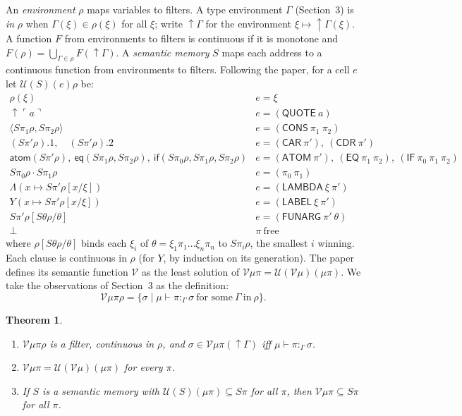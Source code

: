 \documentclass[11pt]{amsart}
\newtheorem{theorem}{Theorem}[section]
\theoremstyle{definition}
\theoremstyle{remark}
\newcommand{\kw}[1]{\mathsf{#1}}
\newcommand{\at}[1]{\ulcorner #1\urcorner}
\newcommand{\obs}[4]{#1\vdash #2:_{#3}#4}
\newcommand{\V}{\mathcal V}
\newcommand{\U}{\mathcal U}
\newcommand{\up}{{\uparrow}}
\begin{document}
An \emph{environment} $\rho$ maps variables to filters. A type
environment $\Gamma$ (Section~3) is \emph{in} $\rho$ when
$\Gamma(\xi)\in\rho(\xi)$ for all $\xi$; write $\up\Gamma$ for the
environment $\xi\mapsto\up\Gamma(\xi)$. A function $F$ from environments to
filters is continuous if it is monotone and
$F(\rho)=\bigcup_{\Gamma\in\rho}F(\up\Gamma)$. A \emph{semantic memory} $S$
maps each address to a continuous function from environments to filters.
Following the paper, for a cell $e$ let $\U(S)(e)\rho$ be:
\[
\begin{array}{ll}
\rho(\xi) & e=\xi\\
\up\at a & e=(\kw{QUOTE}\ a)\\
\langle S\pi_1\rho,S\pi_2\rho\rangle & e=(\kw{CONS}\ \pi_1\ \pi_2)\\
(S\pi'\rho).1,\quad(S\pi'\rho).2 & e=(\kw{CAR}\ \pi'),\ (\kw{CDR}\ \pi')\\
\kw{atom}(S\pi'\rho),\ \kw{eq}(S\pi_1\rho,S\pi_2\rho),\ \kw{if}(S\pi_0\rho,S\pi_1\rho,S\pi_2\rho)
 & e=(\kw{ATOM}\ \pi'),\ (\kw{EQ}\ \pi_1\ \pi_2),\ (\kw{IF}\ \pi_0\ \pi_1\ \pi_2)\\
S\pi_0\rho\cdot S\pi_1\rho & e=(\pi_0\ \pi_1)\\
\Lambda(x\mapsto S\pi'\rho[x/\xi]) & e=(\kw{LAMBDA}\ \xi\ \pi')\\
Y(x\mapsto S\pi'\rho[x/\xi]) & e=(\kw{LABEL}\ \xi\ \pi')\\
S\pi'\rho[S\theta\rho/\theta] & e=(\kw{FUNARG}\ \pi'\ \theta)\\
\bot & \pi\ \text{free}
\end{array}
\]
where $\rho[S\theta\rho/\theta]$ binds each $\xi_i$ of $\theta=\xi_1\pi_1\dots\xi_n\pi_n$
to $S\pi_i\rho$, the smallest $i$ winning. Each clause is continuous in
$\rho$ (for $Y$, by induction on its generation). The paper defines its semantic function $\V$ as the least solution
of $\V\mu\pi=\U(\V\mu)(\mu\pi)$. We take the observations of Section~3 as
the definition:
\[
\V\mu\pi\rho=\{\sigma\mid\obs\mu\pi\Gamma\sigma\ \text{for some}\ \Gamma\ \text{in}\ \rho\}.
\]

\begin{theorem}\label{thm:fix}
\begin{enumerate}
\item $\V\mu\pi\rho$ is a filter, continuous in $\rho$, and
$\sigma\in\V\mu\pi(\up\Gamma)$ iff $\obs\mu\pi\Gamma\sigma$.
\item $\V\mu\pi=\U(\V\mu)(\mu\pi)$ for every $\pi$.
\item If $S$ is a semantic memory with $\U(S)(\mu\pi)\subseteq S\pi$ for all
$\pi$, then $\V\mu\pi\subseteq S\pi$ for all $\pi$.
\end{enumerate}
\end{theorem}
\end{document}

